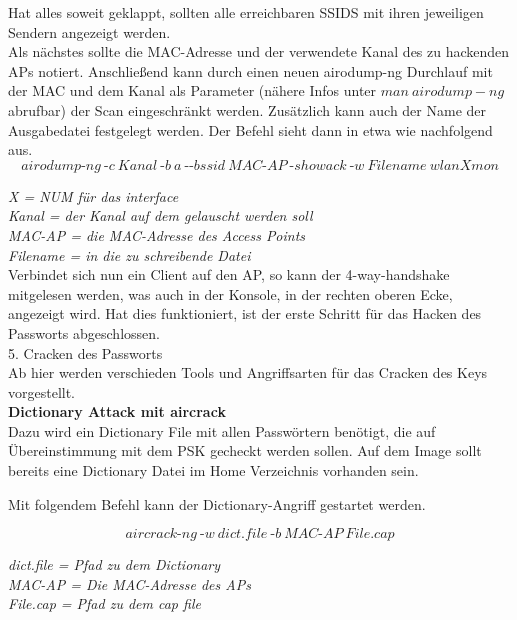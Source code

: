 Hat alles soweit geklappt, sollten alle erreichbaren SSIDS mit ihren jeweiligen Sendern angezeigt werden.\\ 
	
Als nächstes sollte die MAC-Adresse und der verwendete Kanal des zu hackenden APs notiert.
Anschließend kann durch einen neuen airodump-ng Durchlauf mit der MAC und dem Kanal als Parameter (nähere Infos unter \(man~airodump-ng\) abrufbar) der Scan
	eingeschränkt werden. Zusätzlich kann auch der Name der Ausgabedatei festgelegt werden. 
Der Befehl sieht dann in etwa wie nachfolgend aus.
	$$airodump\text{-}ng~\text{-}c~Kanal~\text{-}b~a~\text{-}\text{-}bssid~MAC\text{-}AP~\text{-}showack~\text{-}w~Filename~wlanXmon$$
	
		\textit{X = NUM für das interface}\\
		\textit{Kanal = der Kanal auf dem gelauscht werden soll}\\
		\textit{MAC-AP = die MAC-Adresse des Access Points}\\
		\textit{Filename = in die zu schreibende Datei}\\

	Verbindet sich nun ein Client auf den AP, so kann der 4-way-handshake mitgelesen werden, was auch in der Konsole, in der rechten oberen Ecke, angezeigt wird.
	Hat dies funktioniert, ist der erste Schritt für das Hacken des Passworts abgeschlossen.\\

{\Large 5. Cracken des Passworts}\\
		
Ab hier werden verschieden Tools und Angriffsarten für das Cracken des Keys vorgestellt.\\	

 \textbf{Dictionary Attack mit aircrack}\\

Dazu wird ein Dictionary File mit allen Passwörtern benötigt, die auf Übereinstimmung mit dem PSK gecheckt werden sollen. Auf dem Image sollt bereits eine Dictionary Datei im Home Verzeichnis vorhanden sein.

Mit folgendem Befehl kann der Dictionary-Angriff gestartet werden. 

$$aircrack\text{-}ng~\text{-}w~dict.file~\text{-}b~MAC\text{-}AP~File.cap$$

\textit{dict.file = Pfad zu dem Dictionary}\\ 
\textit{MAC-AP = Die MAC-Adresse des APs}\\ 
\textit{File.cap = Pfad zu dem cap file}\\

